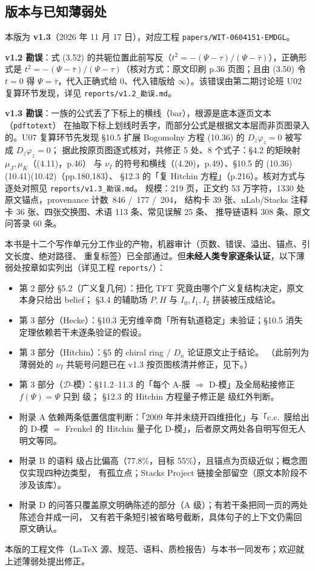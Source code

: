 \subsection*{版本与已知薄弱处}

本版为 \textbf{v1.3}（2026 年 11 月 17 日），对应工程 \texttt{papers/WIT-0604151-EMDGL}。

\textbf{v1.2 勘误}：式 (3.52) 的共轭位置此前写反（$t^2=-(\Psi-\tau)/(\Psi-\bar\tau)$），正确形式是 $t^2=-(\Psi-\bar\tau)/(\Psi-\tau)$（核对方式：原文印刷 p.36 页图；且由 (3.50) 令 $t=0$ 得 $\Psi=\bar\tau$，代入正确式给 $0$、代入错版给 $\infty$）。该错误由第二期讨论班 U02 复算环节发现，详见 \texttt{reports/v1.2\_勘误.md}。

\textbf{v1.3 勘误}：一族的公式丢了下标上的横线（bar），根源是底本逐页文本（\texttt{pdftotext}）
在抽取下标上划线时丢字，而部分公式是根据文本层而非页图录入的。U07 复算环节先发现
§10.5 扩展 Bogomolny 方程 (10.36) 的 $D_{\bar z}\varphi_z=0$ 被写成 $D_z\varphi_z=0$；
据此按原页图逐式核对，共修正 5 处、8 个式子：§4.2 的矩映射 $\mu_J,\mu_K$（(4.11)，p.46）
与 $\nu_I$ 的符号和横线（(4.20)，p.49）、§10.5 的 (10.36)(10.41)(10.42)（pp.180,183）、
§12.3 的「复 Hitchin 方程」（p.216）。核对方式与逐处对照见 \texttt{reports/v1.3\_勘误.md}。
规模：219 页，正文约 53 万字符，1330 处原文锚点，provenance 计数 \pA\,846 / \pB\,177 / \pC\,204，
结构卡 39 张、nLab/Stacks 注释卡 36 张、四张交换图、术语 113 条、常见误解 25 条、
推导链语料 308 条、原文问答录 60 条。

本书是十二个写作单元分工作业的产物，机器审计（页数、错误、溢出、锚点、引文长度、绝对路径、
重复标签）已全部通过。但\textbf{未经人类专家逐条认证}，以下薄弱处按章如实列出（详见工程 \texttt{reports/}）：

\begin{itemize}
\item 第 2 部分 §5.2（广义复几何）：扭化 TFT 究竟由哪个广义复结构决定，原文本身只给出 belief；
      §3.4 的辅助场 $P,H$ 与 $I_0,I_1,I_2$ 拼装被压成结论。
\item 第 3 部分（Hecke）：§10.3 无穷维辛商「所有轨道稳定」未验证；§10.5 消失定理依赖若干未逐条验证的假设。
\item 第 3 部分（Hitchin）：§5 的 chiral ring / $D_n$ 论证原文止于结论。
      （此前列为薄弱处的 $\nu_I$ 共轭号问题已在 v1.3 按页图核清并修正，见下。）
\item 第 3 部分（$\mathcal{D}$-模）：§11.2--11.3 的「每个 A-膜 $\Rightarrow$ D-模」及全局粘接修正 $f(\Psi)=\Psi$ 只到 \pB 级；
      §12.3 的 Hitchin 方程量子修正是 \pC 级红外判断。
\item 附录 A 依赖两条低置信度判断：「2009 年并未绕开四维扭化」与「c.c.\ 膜给出的 D-模 $=$ Frenkel 的
      Hitchin 量子化 D-模」，后者原文两处各自明写但无人明文等同。
\item 附录 B 的语料 \pA 级占比偏高（77.8\%，目标 55\%），且锚点为页级近似；概念图仅实现四种边类型，
      有孤立点；Stacks Project 链接全部留空（原文本阶段不涉及该库）。
\item 附录 D 的问答只覆盖原文明确陈述的部分（A 级）；有若干条把同一页的两处陈述合并成一问，
      又有若干条短引被省略号截断，具体句子的上下文仍需回原文确认。
\end{itemize}

本版的工程文件（LaTeX 源、规范、语料、质检报告）与本书一同发布；欢迎就上述薄弱处提出修正。

